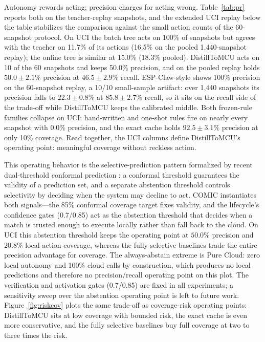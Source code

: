 \documentclass[11pt,a4paper]{article}
\begin{document}
Autonomy rewards acting; precision charges for acting wrong.
Table~\ref{tab:pr} reports both on the teacher-replay snapshots, and the
extended UCI replay below the table stabilizes the comparison against the
small action counts of the 60-snapshot protocol. On UCI the batch tree acts
on 100\% of snapshots but agrees with the teacher on 11.7\% of its actions
(16.5\% on the pooled 1,440-snapshot replay); the online tree is similar at
15.0\% (18.3\% pooled). DistillToMCU acts on 10 of the 60 snapshots and keeps
50.0\% precision, and on the pooled replay holds $50.0 \pm 2.1\%$ precision
at $46.5 \pm 2.9\%$ recall. ESP-Claw-style shows 100\% precision on the
60-snapshot replay, a 10/10 small-sample artifact: over 1,440 snapshots its
precision falls to $22.3 \pm 0.8\%$ at $85.8 \pm 2.7\%$ recall, so it sits on
the recall side of the trade-off while DistillToMCU keeps the calibrated
middle. Both frozen-rule families collapse on UCI: hand-written and one-shot
rules fire on nearly every snapshot with 0.0\% precision, and the exact cache
holds $92.5 \pm 3.1\%$ precision at only 10\% coverage. Read together, the
UCI columns define DistillToMCU's operating point: meaningful coverage
without reckless action.

This operating behavior is the selective-prediction pattern formalized by
recent dual-threshold conformal prediction \cite{36}: a conformal threshold
guarantees the validity of a prediction set, and a separate abstention
threshold controls selectivity by deciding when the system may decline to
act. COMIC instantiates both signals---the 85\% conformal coverage target
fixes validity, and the lifecycle's confidence gates (0.7/0.85) act as the
abstention threshold that decides when a match is trusted enough to execute
locally rather than fall back to the cloud. On UCI this abstention threshold
keeps the operating point at $50.0\%$ precision and $20.8\%$ local-action
coverage, whereas the fully selective baselines trade the entire precision
advantage for coverage. The always-abstain extreme is Pure Cloud: zero local
autonomy and 100\% cloud calls by construction, which produces no local
predictions and therefore no precision/recall operating point on this plot.
The verification and activation gates (0.7/0.85) are fixed in all experiments;
a sensitivity sweep over the abstention operating point is left to future
work. Figure~\ref{fig:riskcov} plots the same trade-off as
coverage-risk operating points: DistillToMCU sits at low coverage with
bounded risk, the exact cache is even more conservative, and the fully
selective baselines buy full coverage at two to three times the risk.
\end{document}
